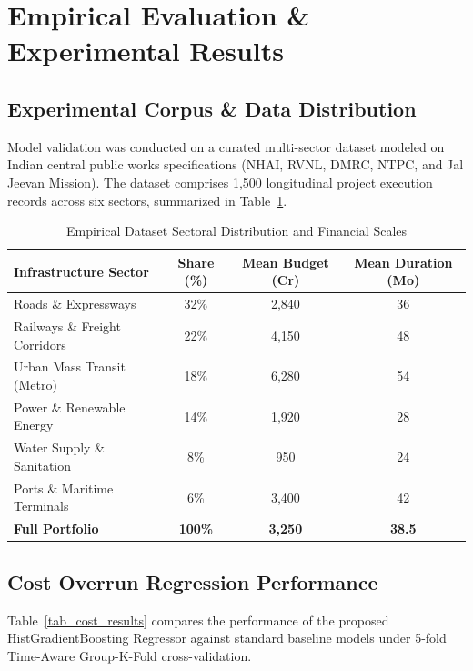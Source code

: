\documentclass[conference]{IEEEtran}
\begin{document}
\section{Empirical Evaluation \& Experimental Results}

\subsection{Experimental Corpus \& Data Distribution}
Model validation was conducted on a curated multi-sector dataset modeled on Indian central public works specifications (NHAI, RVNL, DMRC, NTPC, and Jal Jeevan Mission). The dataset comprises 1,500 longitudinal project execution records across six sectors, summarized in Table~\ref{tab_data_dist}.

\begin{table}[htbp]
\caption{Empirical Dataset Sectoral Distribution and Financial Scales}
\begin{center}
\begin{tabular}{lccc}
\toprule
\textbf{Infrastructure Sector} & \textbf{Share (\%)} & \textbf{Mean Budget (Cr)} & \textbf{Mean Duration (Mo)} \\
\midrule
Roads \& Expressways & 32\% & 2,840 & 36 \\
Railways \& Freight Corridors & 22\% & 4,150 & 48 \\
Urban Mass Transit (Metro) & 18\% & 6,280 & 54 \\
Power \& Renewable Energy & 14\% & 1,920 & 28 \\
Water Supply \& Sanitation & 8\% & 950 & 24 \\
Ports \& Maritime Terminals & 6\% & 3,400 & 42 \\
\midrule
\textbf{Full Portfolio} & \textbf{100\%} & \textbf{3,250} & \textbf{38.5} \\
\bottomrule
\end{tabular}
\label{tab_data_dist}
\end{center}
\end{table}

\subsection{Cost Overrun Regression Performance}
Table~\ref{tab_cost_results} compares the performance of the proposed HistGradientBoosting Regressor against standard baseline models under 5-fold Time-Aware Group-K-Fold cross-validation.
\end{document}
